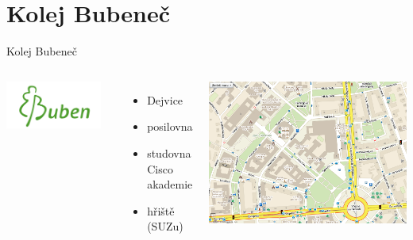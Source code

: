 \documentclass{beamer}
\begin{document}
\section{Kolej Bubeneč}
\begin{frame}{Kolej Bubeneč}
	\begin{columns}[c]
			\begin{center}
				\includegraphics[width=0.9\textwidth]{logo_buk.png}
			\end{center}

			\begin{itemize}
				\item Dejvice
				\item posilovna
				\item studovna Cisco akademie
				\item hřiště (SUZu)
			\end{itemize}
			\begin{center}
				\includegraphics[width=\textwidth]{mapa_all.png}
			\end{center}
	\end{columns}

\end{frame}
\end{document}
